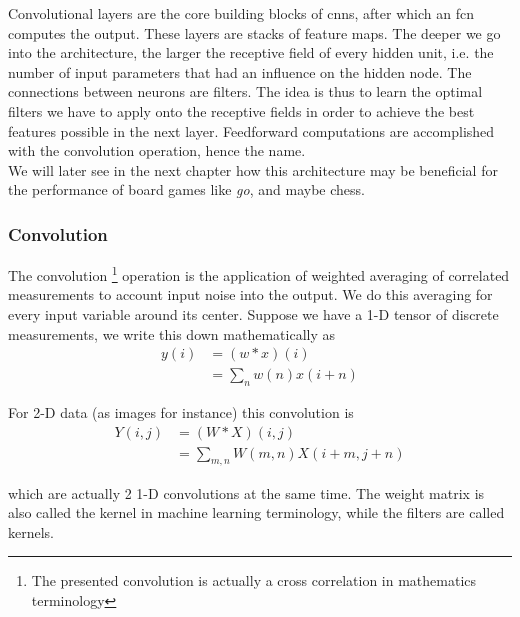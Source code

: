 Convolutional layers are the core building blocks of \gls{cnn}s, after which an \gls{fcn} computes the output. These layers are stacks of feature maps. The deeper we go into the architecture, the larger the receptive field of every hidden unit, i.e. the number of input parameters that had an influence on the hidden node. The connections between neurons are filters. The idea is thus to learn the optimal filters we have to apply onto the receptive fields in order to achieve the best features possible in the next layer. Feedforward computations are accomplished with the convolution operation, hence the name.\\
We will later see in the next chapter how this architecture may be beneficial for the performance of board games like \textit{go}, and maybe chess.

\subsubsection*{Convolution}
The convolution \footnote{The presented convolution is actually a cross correlation in mathematics terminology} operation is the application of weighted averaging of correlated measurements to account input noise into the output. We do this averaging for every input variable around its center. Suppose we have a 1-D tensor of discrete measurements, we write this down mathematically as 
\begin{align}
y(i) &= (w \ast x)(i)\\
&= \sum_{n} w(n) x(i+n)
\end{align}

For 2-D data (as images for instance) this convolution is 
\begin{align}
Y(i,j) &= (W \ast X)(i,j)\\
&= \sum_{m,n} W(m,n) X(i+m,j+n)
\end{align}

which are actually 2 1-D convolutions at the same time. The weight matrix is also called the kernel in machine learning terminology, while the filters are called kernels.\\

